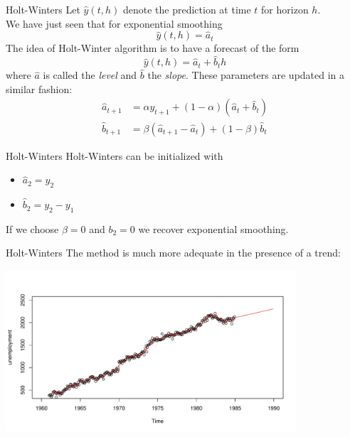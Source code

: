 \documentclass{beamer}
\begin{document}
\begin{frame}{Holt-Winters}
Let $\hat{y}(t,h)$ denote the prediction at time $t$ for horizon $h$.\\
\vspace{5mm}
We have just seen that for exponential smoothing 
$$ \hat{y}(t,h) = \hat{a}_t $$
The idea of Holt-Winter algorithm is to have a forecast of the form 
$$ \hat{y}(t,h) = \hat{a}_t + \hat{b}_t h $$
where $\hat{a}$ is called the \emph{level} and $\hat{b}$ the \emph{slope}. These parameters are updated in a similar fashion:
\begin{equation*}
  \begin{split}
    \hat{a}_{t+1} &= \alpha y_{t+1} + (1 - \alpha)(\hat{a}_{t} + \hat{b}_{t}) \\
    \hat{b}_{t+1} &= \beta (\hat{a}_{t+1} - \hat{a}_{t}) + (1 - \beta)\hat{b}_{t}
  \end{split}
\end{equation*}
\end{frame}

\begin{frame}{Holt-Winters}
Holt-Winters can be initialized with
\begin{itemize}
	\item $\hat{a}_2 = y_2$
	\item $\hat{b}_2 = y_2 - y_1$
\end{itemize}
If we choose $\beta=0$ and $b_2 =0$ we recover exponential smoothing.
\end{frame}

\begin{frame}{Holt-Winters}
The method is much more adequate in the presence of a trend:
\begin{center}
\includegraphics[height=6cm]{figures/R/Holtpredtrend}
\end{center}
\end{frame}
\end{document}
